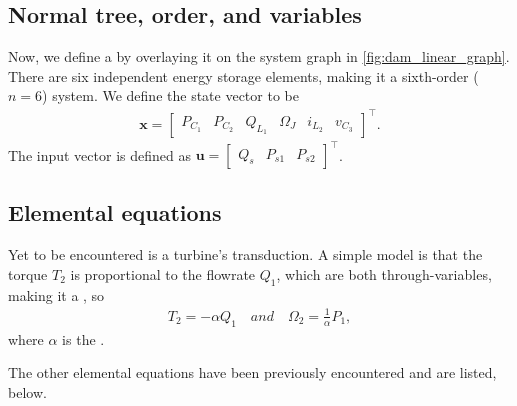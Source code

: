 \documentclass[dynamic_systems.tex]{subfiles}
\begin{document}
\subsection{Normal tree, order, and variables}
\tags{}

Now, we define a  by overlaying it on the system graph in \cref{fig:dam_linear_graph}.
There are six independent energy storage elements, making it a sixth-order ($n=6$) system.
We define the state vector to be
\tags{}
\begin{align}
	\bm{x} = \begin{bmatrix}
		P_{C_1} &
		P_{C_2} &
		Q_{L_1} &
		\Omega_J &
		i_{L_2} &
		v_{C_3}
	\end{bmatrix}^\top.
\end{align}
The input vector is defined as $\bm{u} = \begin{bmatrix} Q_s & P_{s1} & P_{s2} \end{bmatrix}^\top$.

\subsection{Elemental equations}
\tags{}

Yet to be encountered is a turbine's transduction.
A simple model is that the torque $T_2$ is proportional to the flowrate $Q_1$, which are both through-variables, making it a , so
\tags{}
\begin{align}
	T_2 = -\alpha Q_1 \quad {and} \quad
	\Omega_2 = \frac{1}{\alpha} P_1,
\end{align}
where $\alpha$ is the .

The other elemental equations have been previously encountered and are listed, below.
\tags{}
\end{document}
